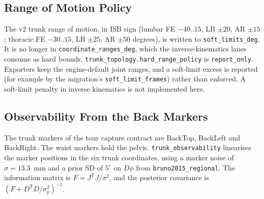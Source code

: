 \documentclass[11pt,a4paper]{article}
\begin{document}
\subsection{Range of Motion Policy}
The v2 trunk range of motion, in ISB sign (lumbar FE $-40..15$, LB $\pm20$,
AR $\pm15$; thoracic FE $-30..15$, LB $\pm25$, AR $\pm50$ degrees), is written
to \texttt{soft\_limits\_deg}. It is no longer in
\texttt{coordinate\_ranges\_deg}, which the inverse-kinematics lanes consume
as hard bounds. \texttt{trunk\_topology.hard\_range\_policy} is
\texttt{report\_only}. Exporters keep the engine-default joint ranges, and a
soft-limit excess is reported (for example by the migration's
\texttt{soft\_limit\_frames}) rather than enforced. A soft-limit penalty in
inverse kinematics is not implemented here.

\subsection{Observability From the Back Markers}
The trunk markers of the tour capture contract are BackTop, BackLeft and
BackRight. The waist markers hold the pelvis. \texttt{trunk\_observability}
linearises the marker positions in the six trunk coordinates, using a
marker noise of $\sigma=13.3$~mm and a prior SD of $5^\circ$ on
$D\phi$ from \texttt{bruno2015\_regional}. The information matrix is
$F=J^{\mathsf T}J/\sigma^2$, and the posterior covariance is
$(F + D^{\mathsf T}D/\sigma_p^2)^{-1}$.
\end{document}
